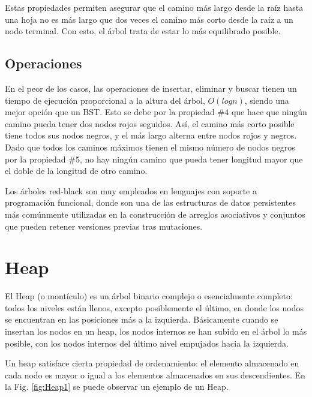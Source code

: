 Estas propiedades permiten asegurar que el camino más largo desde la raíz hasta una hoja no es más largo que dos veces el camino más corto desde la raíz a un nodo terminal. Con esto, el árbol trata de estar lo más equilibrado posible.

\subsection{Operaciones}

En el peor de los casos, las operaciones de insertar, eliminar y buscar tienen un tiempo de ejecución proporcional a la altura del árbol, $O(logn)$, siendo una mejor opción que un BST. Esto se debe por la propiedad \#4 que hace que ningún camino pueda tener dos nodos rojos seguidos. Así, el camino más corto posible tiene todos sus nodos negros, y el más largo alterna entre nodos rojos y negros. Dado que todos los caminos máximos tienen el mismo número de nodos negros por la propiedad \#5, no hay ningún camino que pueda tener longitud mayor que el doble de la longitud de otro camino.

Los árboles red-black son muy empleados en lenguajes con soporte a programación funcional, donde son una de las estructuras de datos persistentes más comúnmente utilizadas en la construcción de arreglos asociativos y conjuntos que pueden retener versiones previas tras mutaciones. 

\section{Heap} \label{lb:heap}

El Heap (o montículo) es un árbol binario complejo o esencialmente completo: todos los niveles están llenos, excepto posiblemente el último, en donde los nodos se encuentran en las posiciones más a la izquierda. Básicamente cuando se insertan los nodos en un heap, los nodos internos se han subido en el árbol lo más posible, con los nodos internos del último nivel empujados hacia la izquierda.

Un heap satisface cierta propiedad de ordenamiento: el elemento almacenado en cada nodo es mayor o igual a los elementos almacenados en sus descendientes. En la Fig. \ref{fig:Heap1} se puede observar un ejemplo de un Heap.


